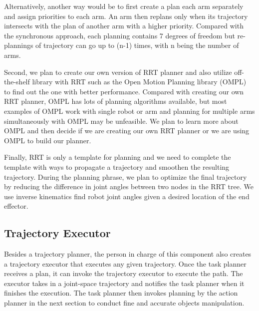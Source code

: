 Alternatively, another way would be to first create a plan each arm separately and assign priorities to each arm. An arm then replans only when its trajectory intersects with the plan of another arm with a higher priority. Compared with the synchronous approach, each planning contains 7 degrees of freedom but re-plannings of trajectory can go up to (n-1) times, with n being the number of arms. 

Second, we plan to create our own version of RRT planner and also utilize off-the-shelf library with RRT such as the Open Motion Planning library (OMPL)~\cite{sucan2012the-open-motion-planning-library} to find out the one with better performance.
Compared with creating our own RRT planner, OMPL has lots of planning algorithms available, but most examples of OMPL work with single robot or arm and planning for multiple arms simultaneously with OMPL may be unfeasible. We plan to learn more about OMPL and then decide if we are creating our own RRT planner or we are using OMPL to build our planner.

Finally, RRT is only a template for planning and we need to complete the template with ways to propagate a trajectory and smoothen the resulting trajectory. 
During the planning phrase, we plan to optimize the final trajectory by reducing the difference in joint angles between two nodes in the RRT tree. We use inverse kinematics find robot joint angles given a desired location of the end effector.




\subsection{Trajectory Executor}

Besides a trajectory planner, the person in charge of this component also creates a trajectory executor that executes any given trajectory.
Once the task planner receives a plan, it can invoke the trajectory executor to execute the path. The executor takes in a joint-space trajectory and notifies the task planner when it finishes the execution. The task planner then invokes planning by the action planner in the next section to conduct fine and accurate objects manipulation.
